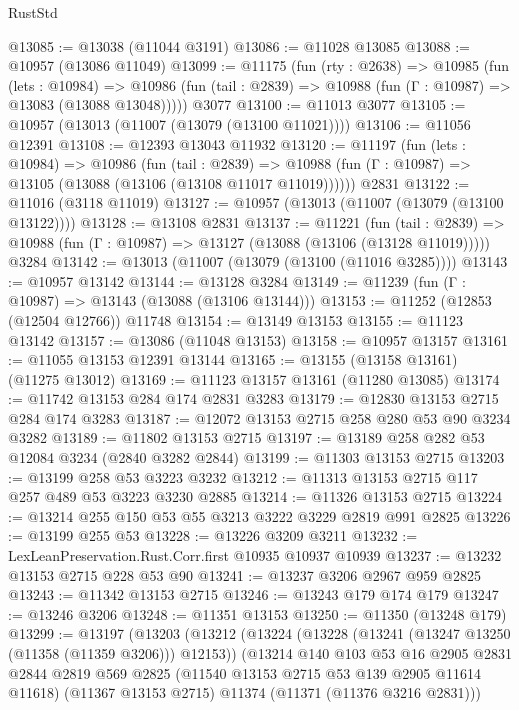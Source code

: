 \begin{lexlean}{RustStd}
\begin{coremodule}
@13085 := @13038 (@11044 @3191)
@13086 := @11028 @13085
@13088 := @10957 (@13086 @11049)
@13099 := @11175
    (fun (rty : @2638) =>
    @10985
      (fun (lets : @10984) =>
      @10986 (fun (tail : @2839) => @10988 (fun (Γ : @10987) => @13083 (@13088 @13048)))))
    @3077
@13100 := @11013 @3077
@13105 := @10957 (@13013 (@11007 (@13079 (@13100 @11021))))
@13106 := @11056 @12391
@13108 := @12393 @13043 @11932
@13120 := @11197
    (fun (lets : @10984) =>
    @10986
      (fun (tail : @2839) =>
      @10988 (fun (Γ : @10987) => @13105 (@13088 (@13106 (@13108 @11017 @11019))))))
    @2831
@13122 := @11016 (@3118 @11019)
@13127 := @10957 (@13013 (@11007 (@13079 (@13100 @13122))))
@13128 := @13108 @2831
@13137 := @11221
    (fun (tail : @2839) => @10988 (fun (Γ : @10987) => @13127 (@13088 (@13106 (@13128 @11019)))))
    @3284
@13142 := @13013 (@11007 (@13079 (@13100 (@11016 @3285))))
@13143 := @10957 @13142
@13144 := @13128 @3284
@13149 := @11239 (fun (Γ : @10987) => @13143 (@13088 (@13106 @13144)))
@13153 := @11252 (@12853 (@12504 @12766)) @11748
@13154 := @13149 @13153
@13155 := @11123 @13142
@13157 := @13086 (@11048 @13153)
@13158 := @10957 @13157
@13161 := @11055 @13153 @12391 @13144
@13165 := @13155 (@13158 @13161) (@11275 @13012)
@13169 := @11123 @13157 @13161 (@11280 @13085)
@13174 := @11742 @13153 @284 @174 @2831 @3283
@13179 := @12830 @13153 @2715 @284 @174 @3283
@13187 := @12072 @13153 @2715 @258 @280 @53 @90 @3234 @3282
@13189 := @11802 @13153 @2715
@13197 := @13189 @258 @282 @53 @12084 @3234 (@2840 @3282 @2844)
@13199 := @11303 @13153 @2715
@13203 := @13199 @258 @53 @3223 @3232
@13212 := @11313 @13153 @2715 @117 @257 @489 @53 @3223 @3230 @2885
@13214 := @11326 @13153 @2715
@13224 := @13214 @255 @150 @53 @55 @3213 @3222 @3229 @2819 @991 @2825
@13226 := @13199 @255 @53
@13228 := @13226 @3209 @3211
@13232 := LexLeanPreservation.Rust.Corr.first @10935 @10937 @10939
@13237 := @13232 @13153 @2715 @228 @53 @90
@13241 := @13237 @3206 @2967 @959 @2825
@13243 := @11342 @13153 @2715
@13246 := @13243 @179 @174 @179
@13247 := @13246 @3206
@13248 := @11351 @13153
@13250 := @11350 (@13248 @179)
@13299 := @13197
    (@13203
      (@13212
        (@13224
          (@13228 (@13241 (@13247 @13250 (@11358 (@11359 @3206))) @12153))
          (@13214
            @140
            @103
            @53
            @16
            @2905
            @2831
            @2844
            @2819
            @569
            @2825
            (@11540 @13153 @2715 @53 @139 @2905 @11614 @11618)
            (@11367 @13153 @2715)
            @11374
            (@11371 (@11376 @3216 @2831)))

\end{coremodule}
\end{lexlean}
